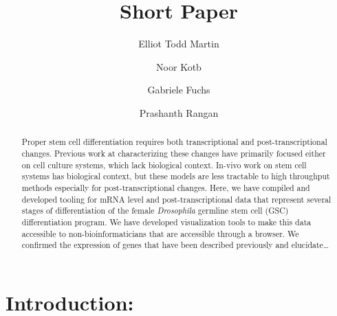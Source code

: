 \documentclass[]{elsarticle} %
\begin{document}
\begin{frontmatter}

  \title{Short Paper}
    \author[University at Albany]{Elliot Todd Martin}
    \author[University at Albany,BMS]{Noor Kotb}
  
    \author[University at Albany]{Gabriele Fuchs}
  
    \author[University at Albany]{Prashanth Rangan}
      \address[University at Albany]{Department of Biological
Sciences/RNA Institute, University at Albany SUNY, Albany, NY 12202,
USA.}
    \address[BMS]{Department of Biomedical Sciences, School of Public
Health, University at Albany SUNY, Rensselaer, NY, 12144, USA.}
  
  \begin{abstract}
  Proper stem cell differentiation requires both transcriptional and
  post-transcriptional changes. Previous work at characterizing these
  changes have primarily focused either on cell culture systems, which
  lack biological context. In-vivo work on stem cell systems has
  biological context, but these models are less tractable to high
  throughput methods especially for post-transcriptional changes. Here,
  we have compiled and developed tooling for mRNA level and
  post-transcriptional data that represent several stages of
  differentiation of the female \emph{Drosophila} germline stem cell
  (GSC) differentiation program. We have developed visualization tools
  to make this data accessible to non-bioinformaticians that are
  accessible through a browser. We confirmed the expression of genes
  that have been described previously and elucidate\ldots{}
  \end{abstract}
  
 \end{frontmatter}

\hypertarget{introduction}{%
\section{Introduction:}\label{introduction}}
\end{document}
